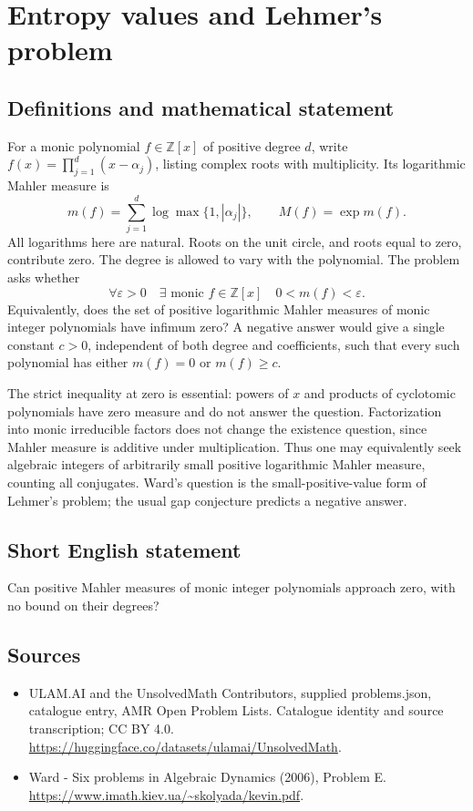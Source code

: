 \documentclass[11pt,a4paper]{article}
\begin{document}
\section*{Entropy values and Lehmer's problem}\label{statement}

\subsection{Definitions and mathematical statement}
For a monic polynomial $f\in\mathbb Z[x]$ of positive degree $d$, write
$f(x)=\prod_{j=1}^d(x-\alpha_j)$, listing complex roots with multiplicity.
Its logarithmic Mahler measure is
\[
 m(f)=\sum_{j=1}^d\log\max\{1,|\alpha_j|\},
 \qquad M(f)=\exp m(f).
\]
All logarithms here are natural. Roots on the unit circle, and roots equal to
zero, contribute zero. The degree is allowed to vary with the polynomial.
The problem asks whether
\[
 \forall\varepsilon>0\quad\exists\text{ monic }f\in\mathbb Z[x]
 \quad 0<m(f)<\varepsilon.
\]
Equivalently, does the set of positive logarithmic Mahler measures of monic
integer polynomials have infimum zero? A negative answer would give a single
constant $c>0$, independent of both degree and coefficients, such that every
such polynomial has either $m(f)=0$ or $m(f)\ge c$.

The strict inequality at zero is essential: powers of $x$ and products of
cyclotomic polynomials have zero measure and do not answer the question.
Factorization into monic irreducible factors does not change the existence
question, since Mahler measure is additive under multiplication. Thus one may
equivalently seek algebraic integers of arbitrarily small positive logarithmic
Mahler measure, counting all conjugates. Ward's question is the small-positive-value
form of Lehmer's problem; the usual gap conjecture predicts a negative answer.
\subsection{Short English statement}
Can positive Mahler measures of monic integer polynomials approach zero, with no bound on their degrees?
\subsection{Sources}
\begin{itemize}
\item[S1] ULAM.AI and the UnsolvedMath Contributors, supplied problems.json, catalogue entry, AMR Open Problem Lists. Catalogue identity and source transcription; CC BY 4.0.
\url{https://huggingface.co/datasets/ulamai/UnsolvedMath}.
\item[S2] Ward - Six problems in Algebraic Dynamics (2006), Problem E. 
\url{https://www.imath.kiev.ua/~skolyada/kevin.pdf}.
\end{itemize}
\end{document}
